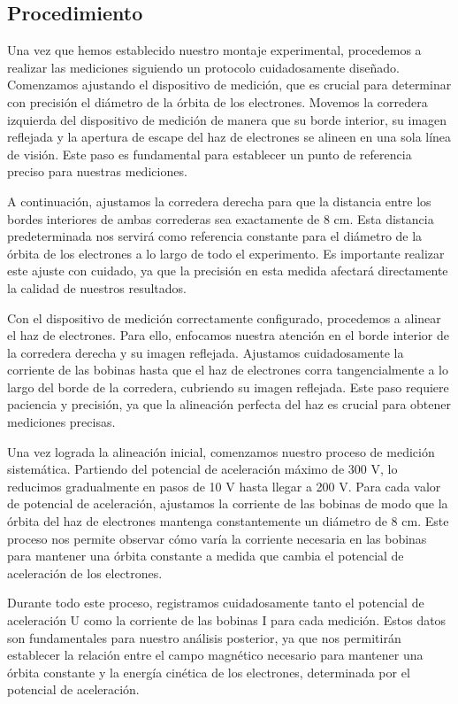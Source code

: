\documentclass[twocolumn,a4paper,11pt]{scrartcl}
\begin{document}
\subsection*{Procedimiento}

Una vez que hemos establecido nuestro montaje experimental, procedemos a realizar las mediciones siguiendo un protocolo cuidadosamente diseñado. Comenzamos ajustando el dispositivo de medición, que es crucial para determinar con precisión el diámetro de la órbita de los electrones. Movemos la corredera izquierda del dispositivo de medición de manera que su borde interior, su imagen reflejada y la apertura de escape del haz de electrones se alineen en una sola línea de visión. Este paso es fundamental para establecer un punto de referencia preciso para nuestras mediciones.

A continuación, ajustamos la corredera derecha para que la distancia entre los bordes interiores de ambas correderas sea exactamente de 8 cm. Esta distancia predeterminada nos servirá como referencia constante para el diámetro de la órbita de los electrones a lo largo de todo el experimento. Es importante realizar este ajuste con cuidado, ya que la precisión en esta medida afectará directamente la calidad de nuestros resultados.

Con el dispositivo de medición correctamente configurado, procedemos a alinear el haz de electrones. Para ello, enfocamos nuestra atención en el borde interior de la corredera derecha y su imagen reflejada. Ajustamos cuidadosamente la corriente de las bobinas hasta que el haz de electrones corra tangencialmente a lo largo del borde de la corredera, cubriendo su imagen reflejada. Este paso requiere paciencia y precisión, ya que la alineación perfecta del haz es crucial para obtener mediciones precisas.

Una vez lograda la alineación inicial, comenzamos nuestro proceso de medición sistemática. Partiendo del potencial de aceleración máximo de 300 V, lo reducimos gradualmente en pasos de 10 V hasta llegar a 200 V. Para cada valor de potencial de aceleración, ajustamos la corriente de las bobinas de modo que la órbita del haz de electrones mantenga constantemente un diámetro de 8 cm. Este proceso nos permite observar cómo varía la corriente necesaria en las bobinas para mantener una órbita constante a medida que cambia el potencial de aceleración de los electrones.

Durante todo este proceso, registramos cuidadosamente tanto el potencial de aceleración U como la corriente de las bobinas I para cada medición. Estos datos son fundamentales para nuestro análisis posterior, ya que nos permitirán establecer la relación entre el campo magnético necesario para mantener una órbita constante y la energía cinética de los electrones, determinada por el potencial de aceleración.
\end{document}
